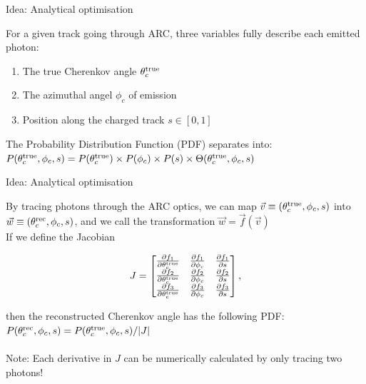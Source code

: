 \documentclass{beamer}
\begin{document}
\begin{frame}{Idea: Analytical optimisation}
  \begin{center}
    For a given track going through ARC, three variables fully describe each emitted photon:
  \end{center}
  \begin{enumerate}
    \setlength\itemsep{0.5em}
    \item{The true Cherenkov angle $\theta_c^{\rm true}$}
    \item{The azimuthal angel $\phi_c$ of emission}
    \item{Position along the charged track $s\in[0, 1]$}
  \end{enumerate}
  \vspace{0.7cm}
  \begin{center}
    The Probability Distribution Function (PDF) separates into: \\
    $P(\theta_c^{\rm true}, \phi_c, s) = P(\theta_c^{\rm true})\times P(\phi_c)\times P(s)\times\Theta(\theta_c^{\rm true}, \phi_c, s)$
  \end{center}
\end{frame}

\begin{frame}{Idea: Analytical optimisation}
  \begin{center}
    By tracing photons through the ARC optics, we can map $\vec{v}\equiv(\theta_c^{\rm true}, \phi_c, s)$ into $\vec{w}\equiv(\theta_c^{\rm rec}, \phi_c, s)$, and we call the transformation $\vec{w} = \vec{f}(\vec{v})$ \\
    If we define the Jacobian \\
  \end{center}
  \begin{equation*}
    J =
    \begin{bmatrix}
      \frac{\partial f_1}{\partial \theta_c^{\rm true}} & \frac{\partial f_1}{\partial \phi_c} & \frac{\partial f_1}{\partial s} \\
      \frac{\partial f_2}{\partial \theta_c^{\rm true}} & \frac{\partial f_2}{\partial \phi_c} & \frac{\partial f_2}{\partial s} \\
      \frac{\partial f_3}{\partial \theta_c^{\rm true}} & \frac{\partial f_3}{\partial \phi_c} & \frac{\partial f_3}{\partial s} \\
    \end{bmatrix},
  \end{equation*}
  \begin{center}
    then the reconstructed Cherenkov angle has the following PDF: \\
    $P(\theta_c^{\rm rec}, \phi_c, s) = P(\theta_c^{\rm true}, \phi_c, s)/\lvert J\rvert$ \\~\\
    Note: Each derivative in $J$ can be numerically calculated by only tracing two photons!
  \end{center}
\end{frame}
\end{document}
